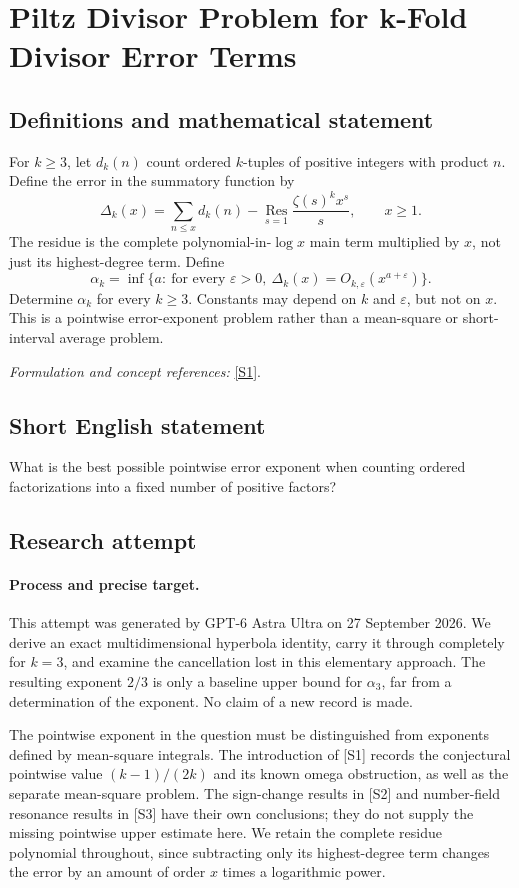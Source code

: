 \documentclass[11pt]{article}
\begin{document}
\section*{\texorpdfstring{Piltz Divisor Problem for k-Fold Divisor Error Terms}{Piltz Divisor Problem for k-Fold Divisor Error Terms}}\label{statement}
\subsection{Definitions and mathematical statement}
For $k\ge3$, let $d_k(n)$ count ordered $k$-tuples of positive integers with product $n$. Define the error in the summatory function by
\[
 \Delta_k(x)=\sum_{n\le x}d_k(n)
 -\operatorname*{Res}_{s=1}\frac{\zeta(s)^k x^s}{s},\qquad x\ge1.
\]
The residue is the complete polynomial-in-$\log x$ main term multiplied by $x$, not just its highest-degree term. Define
\[
 \alpha_k=\inf\{a:\ \text{for every }{\varepsilon}>0,
 \ \Delta_k(x)=O_{k,{\varepsilon}}(x^{a+{\varepsilon}})\}.
\]
Determine $\alpha_k$ for every $k\ge3$. Constants may depend on $k$ and ${\varepsilon}$, but not on $x$. This is a pointwise error-exponent problem rather than a mean-square or short-interval average problem.
\par\smallskip\textit{Formulation and concept references:} \href{https://arxiv.org/html/2303.05028}{[S1]}.

\subsection{Short English statement}
What is the best possible pointwise error exponent when counting ordered factorizations into a fixed number of positive factors?
\subsection{Research attempt}
\paragraph{Process and precise target.}
This attempt was generated by GPT-6 Astra Ultra on 27 September 2026. We derive an exact multidimensional hyperbola identity, carry it through completely for $k=3$, and examine the cancellation lost in this elementary approach. The resulting exponent $2/3$ is only a baseline upper bound for $\alpha_3$, far from a determination of the exponent. No claim of a new record is made.

The pointwise exponent in the question must be distinguished from exponents defined by mean-square integrals. The introduction of [S1] records the conjectural pointwise value $(k-1)/(2k)$ and its known omega obstruction, as well as the separate mean-square problem. The sign-change results in [S2] and number-field resonance results in [S3] have their own conclusions; they do not supply the missing pointwise upper estimate here. We retain the complete residue polynomial throughout, since subtracting only its highest-degree term changes the error by an amount of order $x$ times a logarithmic power.
\end{document}
